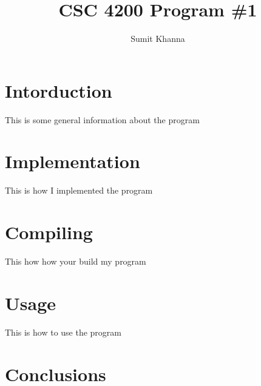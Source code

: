\documentclass[a4paper,11pt]{article}
\author{Sumit Khanna}
\title{CSC 4200 Program \#1}
\begin{document}
\maketitle
\section{Intorduction}
This is some general information about the program

\section{Implementation}
This is how I implemented the program

\section{Compiling}
This how how your build my program

\section{Usage}
This is how to use the program

\section{Conclusions}
\end{document}
